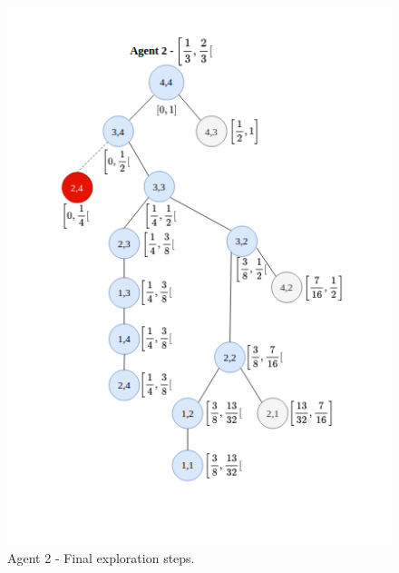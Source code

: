 \begin{figure}[H]
    \centering
    \includegraphics[width=1\textwidth]{ApeA/maze_agent_2_step_4.png}
    \caption{Agent 2 - Final exploration steps.}
    \label{fig_agent_2_step_4}
\end{figure}

